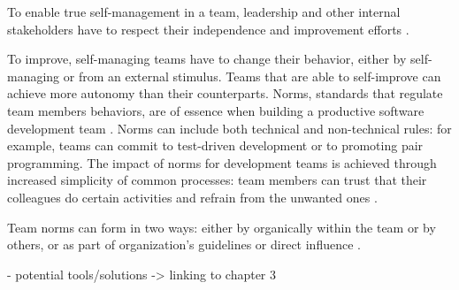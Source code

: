 To enable true self-management in a team, leadership and other internal stakeholders have to respect their independence and improvement efforts \cite{moe_overcoming_2010}. 

To improve, self-managing teams have to change their behavior, either by self-managing or from an external stimulus. Teams that are able to self-improve can achieve more autonomy than their counterparts. Norms, standards that regulate team members behaviors, are of essence when building a productive software development team \cite{abrahamsson_exploring_2016}. Norms can include both technical and non-technical rules: for example, teams can commit to test-driven development or to promoting pair programming. The impact of norms for development teams is achieved through increased simplicity of common processes: team members can trust that their colleagues do certain activities and refrain from the unwanted ones \cite{abrahamsson_exploring_2016}. 

Team norms can form in two ways: either by organically within the team or by others, or as part of organization's guidelines or direct influence \cite{teh_social_2012}. 

- potential tools/solutions
-> linking to chapter 3